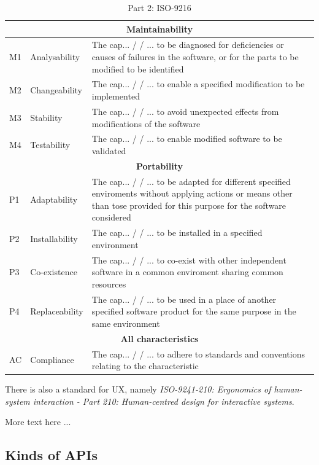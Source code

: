 \documentclass{article}
\begin{document}
\begin{table}[H]
\centering
\begin{tabularx}{\columnwidth}{|l|l|X|}
\hline
\multicolumn{3}{c}{\textbf{Maintainability}} \\ \hline
M1&Analysability & The cap... / / ... to be diagnosed for deficiencies or causes of failures in the
software, or for the parts to be modified to be identified \\ \hline
M2&Changeability & The cap... / / ... to enable a specified modification to be implemented \\ \hline
M3&Stability & The cap... / / ... to avoid unexpected effects from modifications of the software \\ \hline
M4&Testability &The cap... / / ... to enable modified software to be validated \\ \hline

\multicolumn{3}{c}{\textbf{Portability}} \\ \hline
P1& Adaptability &The cap... / / ... to be adapted for different specified enviroments without applying
actions or means other than tose provided for this purpose for the software considered \\ \hline
P2&Installability& The cap... / / ... to be installed in a specified environment \\ \hline
P3&Co-existence &The cap... / / ... to co-exist with other independent software in a common enviroment sharing
common resources \\ \hline
P4&Replaceability &The cap... / / ... to be used in a place of another specified software product for the same
purpose in the same environment \\ \hline

\multicolumn{3}{c}{\textbf{All characteristics}} \\ \hline
AC&Compliance & The cap... / / ... to adhere to standards and conventions relating to the
characteristic \\ \hline
\end{tabularx}
\caption{Part 2: ISO-9216}
\label{tabl:standard2}
\end{table}


There is also a standard for UX,
namely \textit{ISO-9241-210: Ergonomics of human-system interaction -
Part 210: Human-centred design for interactive systems}.

More text here ...
\subsection{Kinds of APIs}
\end{document}
